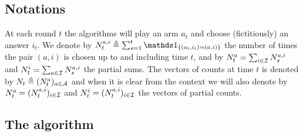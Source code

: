 

\subsection{Notations}

At each round $t$ the algorithms will play an arm $a_t$ and choose (fictitiously) an answer $i_t$. We denote by $N_t^{a,i} \eqdef\sum_{s=1}^t \ind_{\{(a_t,i_t)=(a,i)\}}$ the number of times the pair $(a,i)$ is chosen up to and including time $t$, and by $N_t^a =\sum_{i\in\mathcal{I}} N_s^{a,i}$ and $N_t^i =\sum_{a\in\mathcal{I}} N_s^{a,i}$ the partial sums. The vectors of counts at time $t$ is denoted by $N_t \triangleq (N_t^a)_{a\in\mathcal{A}}$
and when it is clear from the context we will also denote by $N_t^a = (N_t^{a,i})_{i\in\mathcal{I}}$ and $N_t^i = (N_t^{a,i})_{i\in\mathcal{I}}$ the vectors of partial counts.



\subsection{The \LG{} algorithm}

